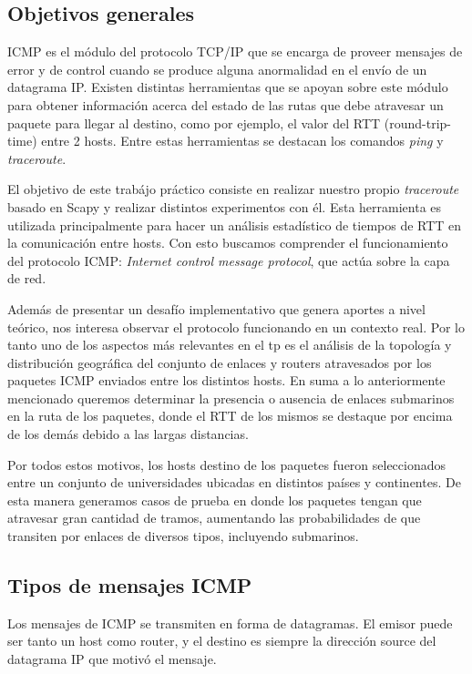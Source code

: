 \subsection{Objetivos generales}

ICMP es el m\'odulo del protocolo TCP/IP que se encarga de proveer mensajes de error y de control cuando
se produce alguna anormalidad en el env\'io de un datagrama IP. Existen distintas herramientas
que se apoyan sobre este m\'odulo para obtener informaci\'on acerca del estado de las rutas que
debe atravesar un paquete para llegar al destino, como por ejemplo, el valor del RTT (round-trip-time)
entre 2 hosts. Entre estas herramientas se destacan los comandos \emph{ping} y \emph{traceroute}.

El objetivo de este trab\'ajo pr\'actico consiste en realizar nuestro propio
\emph{traceroute} basado en Scapy y realizar distintos experimentos con \'el.
Esta herramienta es utilizada principalmente para hacer un an\'alisis estad\'istico de tiempos
de RTT en la comunicaci\'on entre hosts. Con esto buscamos comprender el funcionamiento del protocolo
ICMP: \emph{Internet control message protocol}, que act\'ua sobre la capa de red.

Adem\'as de presentar un desaf\'io implementativo que genera aportes a nivel te\'orico, nos interesa
observar el protocolo funcionando en un contexto real. Por lo tanto uno de los aspectos
m\'as relevantes en el tp es el an\'alisis de la topolog\'ia y distribuci\'on geogr\'afica del conjunto de enlaces
y routers atravesados por los paquetes ICMP enviados entre los distintos hosts. En suma a lo
anteriormente mencionado queremos determinar la presencia o ausencia de enlaces submarinos en
la ruta de los paquetes, donde el RTT de los mismos se destaque por encima de los
dem\'as debido a las largas distancias.

Por todos estos motivos, los hosts destino de los paquetes fueron seleccionados entre un conjunto de universidades ubicadas en distintos pa\'ises y continentes. De esta manera generamos casos de
prueba en donde los paquetes tengan que atravesar gran cantidad de tramos,
aumentando las probabilidades de que transiten por enlaces de diversos tipos, incluyendo submarinos.


\subsection{Tipos de mensajes ICMP}

Los mensajes de ICMP se transmiten en forma de datagramas. El emisor puede ser tanto un host como router,
y el destino es siempre la direcci\'on source del datagrama IP que motiv\'o el mensaje.

